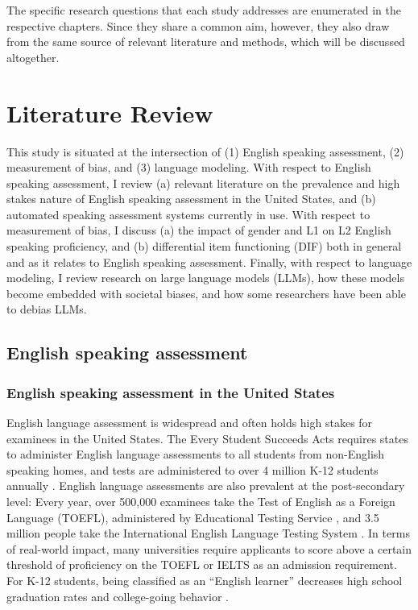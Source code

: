 \documentclass [PhD] {uclathes}
\begin{document}
The specific research questions that each study addresses are enumerated in the respective chapters. Since they share a common aim, however, they also draw from the same source of relevant literature and methods, which will be discussed altogether.



\chapter{Literature Review}

This study is situated at the intersection of (1) English speaking assessment, (2) measurement of bias, and (3) language modeling. With respect to English speaking assessment, I review (a) relevant literature on the prevalence and high stakes nature of English speaking assessment in the United States, and (b) automated speaking assessment systems currently in use. With respect to measurement of bias, I discuss (a) the impact of gender and L1 on L2 English speaking proficiency, and (b) differential item functioning (DIF) both in general and as it relates to English speaking assessment. Finally, with respect to language modeling, I review research on large language models (LLMs), how these models become embedded with societal biases, and how some researchers have been able to debias LLMs. 

\section{English speaking assessment}

\subsection{English speaking assessment in the United States}

English language assessment is widespread and often holds high stakes for examinees in the United States. The Every Student Succeeds Acts \citep{essa2015} requires states to administer English language assessments to all students from non-English speaking homes, and tests are administered to over 4 million K-12 students annually \citep{irwin2021report}. English language assessments are also prevalent at the post-secondary level: Every year, over 500,000 examinees take the Test of English as a Foreign Language (TOEFL), administered by Educational Testing Service \citep{ets2005}, and 3.5 million people take the International English Language Testing System \citep{ielts2023}. In terms of real-world impact, many universities require applicants to score above a certain threshold of proficiency on the TOEFL or IELTS as an admission requirement. For K-12 students, being classified as an “English learner” decreases high school graduation rates and college-going behavior \citep{johnson2019effects}.
\end{document}

